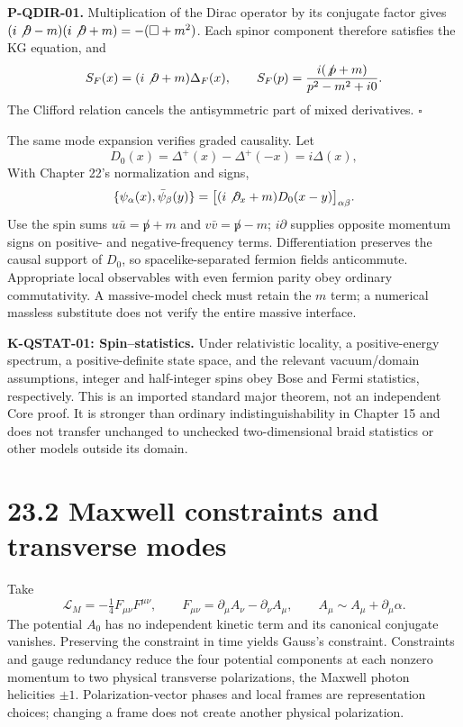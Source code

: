 \documentclass[
  11pt,
  oneside]{book}
\begin{document}
\label{p-qdir-01}{}

\textbf{P-QDIR-01.} Multiplication of the Dirac operator by its
conjugate factor gives
\((i\not\partial-m)(i\not\partial+m)=-(\Box+m^2)\). Each spinor
component therefore satisfies the KG equation, and \[
S_F(x)=(i\not\partial+m)\Delta_F(x),\qquad
S_F(p)=\frac{i(\not p+m)}{p^2-m^2+i0}.
\] The Clifford relation cancels the antisymmetric part of mixed
derivatives. \(\square\)

The same mode expansion verifies graded causality. Let \[
D_0(x)=\Delta^+(x)-\Delta^+(-x)=i\Delta(x),
\] With Chapter 22's normalization and signs, \[
\{\psi_\alpha(x),\bar\psi_\beta(y)\}
=\bigl[(i\not\partial_x+m)D_0(x-y)\bigr]_{\alpha\beta}.
\] Use the spin sums \(u\bar u=\not p+m\) and \(v\bar v=\not p-m\);
\(i\partial\) supplies opposite momentum signs on positive- and
negative-frequency terms. Differentiation preserves the causal support
of \(D_0\), so spacelike-separated fermion fields anticommute.
Appropriate local observables with even fermion parity obey ordinary
commutativity. A massive-model check must retain the \(m\) term; a
numerical massless substitute does not verify the entire massive
interface.

\textbf{K-QSTAT-01: Spin--statistics.} Under relativistic locality, a
positive-energy spectrum, a positive-definite state space, and the
relevant vacuum/domain assumptions, integer and half-integer spins obey
Bose and Fermi statistics, respectively. This is an imported standard
major theorem, not an independent Core proof. It is stronger than
ordinary indistinguishability in Chapter 15 and does not transfer
unchanged to unchecked two-dimensional braid statistics or other models
outside its domain.

\section{23.2 Maxwell constraints and transverse modes}

Take \[
\mathcal L_M=-\tfrac14F_{\mu\nu}F^{\mu\nu},\qquad
F_{\mu\nu}=\partial_\mu A_\nu-\partial_\nu A_\mu,
\qquad A_\mu\sim A_\mu+\partial_\mu\alpha.
\] The potential \(A_0\) has no independent kinetic term and its
canonical conjugate vanishes. Preserving the constraint in time yields
Gauss's constraint. Constraints and gauge redundancy reduce the four
potential components at each nonzero momentum to two physical transverse
polarizations, the Maxwell photon helicities \(\pm1\).
Polarization-vector phases and local frames are representation choices;
changing a frame does not create another physical polarization.
\end{document}
